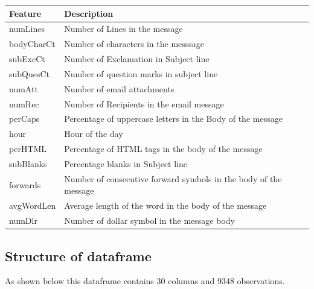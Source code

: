 \documentclass[
]{article}
\begin{document}
\begin{table}[H]
\centering
\begin{tabular}[t]{l>{\raggedright\arraybackslash}p{30em}}
\toprule
Feature & Description\\
\midrule
numLines & Number of Lines in the message\\
bodyCharCt & Number of characters in the messsage\\
subExcCt & Number of Exclamation in Subject line\\
subQuesCt & Number of question marks in subject line\\
numAtt & Number of email attachments\\
\addlinespace
numRec & Number of Recipients in the email message\\
perCaps & Percentage of uppercase letters in the Body of the message\\
hour & Hour of the day\\
perHTML & Percentage of HTML tags in the body of the message\\
subBlanks & Percentage blanks in Subject line\\
\addlinespace
forwards & Number of consecutive forward symbols in the body of the message\\
avgWordLen & Average length of the word in the body of the message\\
numDlr & Number of dollar symbol in the message body\\
\bottomrule
\end{tabular}
\end{table}

\hypertarget{structure-of-dataframe}{%
\subsection{Structure of dataframe}\label{structure-of-dataframe}}

As shown below this dataframe contains 30 columns and 9348 observations.
\end{document}
